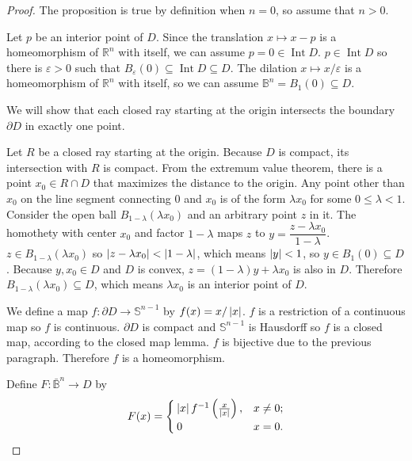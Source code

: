 \begin{proof}
	The proposition is true by definition when $n = 0$, so assume that $n > 0$.

	Let $p$ be an interior point of $D$. Since the translation $x\mapsto x - p$ is a homeomorphism of $\mathbb{R}^{n}$ with itself, we can assume $p = 0 \in \operatorname{Int} D$. $p \in \operatorname{Int} D$ so there is $\varepsilon > 0$ such that $B_{\varepsilon}(0) \subseteq \operatorname{Int} D \subseteq D$. The dilation $x\mapsto x/\varepsilon$ is a homeomorphism of $\mathbb{R}^{n}$ with itself, so we can assume $\mathbb{B}^{n} = B_{1}(0) \subseteq D$.

	We will show that each closed ray starting at the origin intersects the boundary $\partial D$ in exactly one point.

	Let $R$ be a closed ray starting at the origin. Because $D$ is compact, its intersection with $R$ is compact. From the extremum value theorem, there is a point $x_{0} \in R\cap D$ that maximizes the distance to the origin. Any point other than $x_{0}$ on the line segment connecting $0$ and $x_{0}$ is of the form $\lambda x_{0}$ for some $0\leq \lambda < 1$. Consider the open ball $B_{1-\lambda}(\lambda x_{0})$ and an arbitrary point $z$ in it. The homothety with center $x_{0}$ and factor $1 - \lambda$ maps $z$ to $y = \dfrac{z - \lambda x_{0}}{1 - \lambda}$. $z \in B_{1 - \lambda}(\lambda x_{0})$ so $\left\vert{z - \lambda x_{0}}\right\vert < \left\vert{1 - \lambda}\right\vert$, which means $\left\vert{y}\right\vert < 1$, so $y \in B_{1}(0) \subseteq D$. Because $y, x_{0} \in D$ and $D$ is convex, $z = (1 - \lambda)y + \lambda x_{0}$ is also in $D$. Therefore $B_{1 - \lambda}(\lambda x_{0}) \subseteq D$, which means $\lambda x_{0}$ is an interior point of $D$.

	We define a map $f: \partial D \to \mathbb{S}^{n-1}$ by $f(x) = x/\left\vert{x}\right\vert$. $f$ is a restriction of a continuous map so $f$ is continuous. $\partial D$ is compact and $\mathbb{S}^{n-1}$ is Hausdorff so $f$ is a closed map, according to the closed map lemma. $f$ is bijective due to the previous paragraph. Therefore $f$ is a homeomorphism.

	Define $F: \bar{\mathbb{B}}^{n} \to D$ by
	\begin{align*}
		F(x) = \begin{cases}
			       \left\vert{x}\right\vert f^{-1}\left(\frac{x}{\left\vert{x}\right\vert}\right), & x\ne 0; \\
			       0                                             & x = 0.
		       \end{cases}
	\end{align*}


\end{proof}
